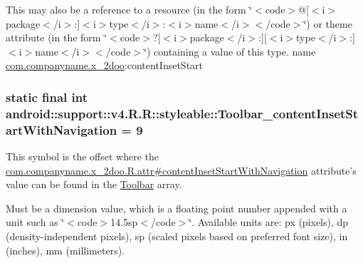 This may also be a reference to a resource (in the form \char`\"{}$<$code$>$@\mbox{[}$<$i$>$package$<$/i$>$:\mbox{]}$<$i$>$type$<$/i$>$:$<$i$>$name$<$/i$>$$<$/code$>$\char`\"{}) or theme attribute (in the form \char`\"{}$<$code$>$?\mbox{[}$<$i$>$package$<$/i$>$:\mbox{]}\mbox{[}$<$i$>$type$<$/i$>$:\mbox{]}$<$i$>$name$<$/i$>$$<$/code$>$\char`\"{}) containing a value of this type.  name \hyperlink{namespacecom_1_1companyname_1_1x__2doo}{com.companyname.x\_\-2doo}:contentInsetStart \hypertarget{classandroid_1_1support_1_1v4_1_1_r_1_1styleable_f5a322ce2aca1623eb518f2758625f9c}{
\subsubsection[{Toolbar\_\-contentInsetStartWithNavigation}]{\setlength{\rightskip}{0pt plus 5cm}static final int android::support::v4.R.R::styleable::Toolbar\_\-contentInsetStartWithNavigation = 9}}
\label{classandroid_1_1support_1_1v4_1_1_r_1_1styleable_f5a322ce2aca1623eb518f2758625f9c}


This symbol is the offset where the \hyperlink{classcom_1_1companyname_1_1x__2doo_1_1_r_1_1attr_dc8987105bb00e0753b0e251a2e2c21e}{com.companyname.x\_\-2doo.R.attr\#contentInsetStartWithNavigation} attribute's value can be found in the \hyperlink{classandroid_1_1support_1_1v4_1_1_r_1_1styleable_0646d71cfbd4a8645c7d805b33e1c574}{Toolbar} array.

Must be a dimension value, which is a floating point number appended with a unit such as \char`\"{}$<$code$>$14.5sp$<$/code$>$\char`\"{}. Available units are: px (pixels), dp (density-independent pixels), sp (scaled pixels based on preferred font size), in (inches), mm (millimeters). 

